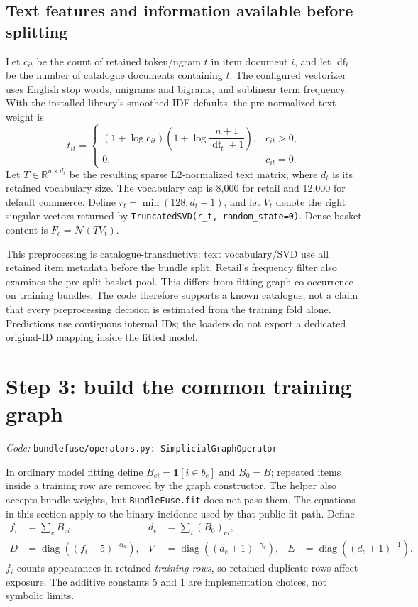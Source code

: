 \documentclass[11pt,a4paper]{article}
\newcommand{\code}[1]{\nolinkurl{#1}}
\newcommand{\src}[1]{\par\begingroup\raggedright\textit{Code: }\code{#1}\par\endgroup}
\newcommand{\R}{\mathbb R}
\newcommand{\diag}{\operatorname{diag}}
\newcommand{\normrows}{\mathcal N}
\numberwithin{equation}{section}
\begin{document}
\subsection{Text features and information available before splitting}\label{sec:text}
Let $c_{it}$ be the count of retained token/ngram $t$ in item document $i$, and let
$\operatorname{df}_t$ be the number of catalogue documents containing $t$. The configured
vectorizer uses English stop words, unigrams and bigrams, and sublinear term frequency.
With the installed library's smoothed-IDF defaults, the pre-normalized text weight is
\begin{equation}
 t_{it}=\begin{cases}
 (1+\log c_{it})\left(1+\log\dfrac{n+1}{\operatorname{df}_t+1}\right),&c_{it}>0,\\
 0,&c_{it}=0.
 \end{cases}
\end{equation}
Let $T\in\R^{n\times d_t}$ be the resulting sparse L2-normalized text matrix, where
$d_t$ is its retained vocabulary size. The vocabulary cap is 8,000 for retail and 12,000
for default commerce. Define $r_t=\min(128,d_t-1)$, and let $V_t$ denote the right
singular vectors returned by \code{TruncatedSVD(r_t, random_state=0)}. Dense basket
content is $F_c=\normrows(TV_t)$.

This preprocessing is catalogue-transductive: text vocabulary/SVD use all retained item
metadata before the bundle split. Retail's frequency filter also examines the pre-split
basket pool. This differs from fitting graph co-occurrence on training bundles. The code
therefore supports a known catalogue, not a claim that every preprocessing decision is
estimated from the training fold alone. Predictions use contiguous internal IDs; the
loaders do not export a dedicated original-ID mapping inside the fitted model.

\section{Step 3: build the common training graph}\label{sec:graph}
\src{bundlefuse/operators.py: SimplicialGraphOperator}
In ordinary model fitting define $B_{ei}=\mathbf1[i\in b_e]$ and $B_0=B$; repeated items
inside a training row are removed by the graph constructor. The helper also accepts bundle
weights, but \code{BundleFuse.fit} does not pass them. The equations in this section apply
to the binary incidence used by that public fit path. Define
\begin{align}
 f_i&=\sum_e B_{ei},&d_e&=\sum_i(B_0)_{ei},\\
 D&=\diag((f_i+5)^{-\alpha_d}),&
 V&=\diag((d_e+1)^{-\gamma_v}),&
 E&=\diag((d_e+1)^{-1}).
\end{align}
$f_i$ counts appearances in retained \emph{training rows}, so retained duplicate rows affect
exposure. The additive constants 5 and 1 are implementation choices, not symbolic limits.
\end{document}
